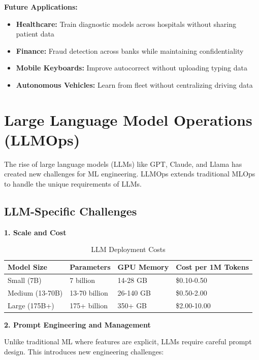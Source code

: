 \textbf{Future Applications:}
\begin{itemize}
    \item \textbf{Healthcare:} Train diagnostic models across hospitals without sharing patient data
    \item \textbf{Finance:} Fraud detection across banks while maintaining confidentiality
    \item \textbf{Mobile Keyboards:} Improve autocorrect without uploading typing data
    \item \textbf{Autonomous Vehicles:} Learn from fleet without centralizing driving data
\end{itemize}

\section{Large Language Model Operations (LLMOps)}

The rise of large language models (LLMs) like GPT, Claude, and Llama has created new challenges for ML engineering. LLMOps extends traditional MLOps to handle the unique requirements of LLMs.

\subsection{LLM-Specific Challenges}

\textbf{1. Scale and Cost}

\begin{table}[h]
\centering
\caption{LLM Deployment Costs}
\begin{tabular}{p{3cm}p{2.5cm}p{2.5cm}p{4cm}}
\toprule
\textbf{Model Size} & \textbf{Parameters} & \textbf{GPU Memory} & \textbf{Cost per 1M Tokens} \\
\midrule
Small (7B) & 7 billion & 14-28 GB & \$0.10-0.50 \\
\midrule
Medium (13-70B) & 13-70 billion & 26-140 GB & \$0.50-2.00 \\
\midrule
Large (175B+) & 175+ billion & 350+ GB & \$2.00-10.00 \\
\bottomrule
\end{tabular}
\end{table}

\textbf{2. Prompt Engineering and Management}

Unlike traditional ML where features are explicit, LLMs require careful prompt design. This introduces new engineering challenges:

